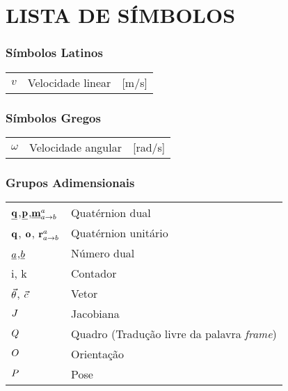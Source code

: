 




\chapter*{LISTA DE SÍMBOLOS}




\subsection*{Símbolos Latinos}

\begin{tabular}{p{}p{}>{\PreserveBacklash\raggedleft}p{}}
$v$  & Velocidade linear  & {[}m/s{]}\tabularnewline
\end{tabular}


\subsection*{Símbolos Gregos}

\begin{tabular}{p{}p{}>{\PreserveBacklash\raggedleft}p{}}
$\omega$ & Velocidade angular & {[}rad/s{]}\tabularnewline
\end{tabular}


\subsection*{Grupos Adimensionais}

\begin{tabular}{p{}p{}}
$\underline{\mathbf{q}}$,$\underline{\mathbf{p}}$,$\underline{\mathbf{m}}_{a\rightarrow b}^{a}$ & Quatérnion dual\tabularnewline
$\mathbf{q}$, $\mathbf{o}$, $\mathbf{r}_{a\rightarrow b}^{a}$ & Quatérnion unitário\tabularnewline
$\underline{a}$,$\underline{b}$ & Número dual\tabularnewline
i, k & Contador\tabularnewline
$\vec{\theta}$, $\vec{c}$ & Vetor\tabularnewline
$J$ & Jacobiana\tabularnewline
$Q^{}$ & Quadro (Tradução livre da palavra \textit{frame})\tabularnewline
$O_{}^{}$ & Orientação\tabularnewline
$P_{}^{}$ & Pose\tabularnewline
\end{tabular}


